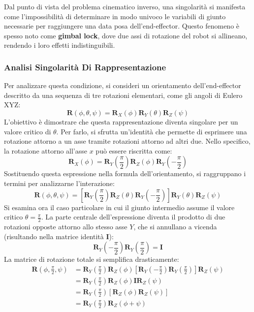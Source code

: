 ﻿\documentclass[11pt, a4paper]{article}
\begin{document}
Dal punto di vista del problema cinematico inverso, una singolarità si manifesta come l'impossibilità di determinare in modo univoco le variabili di giunto necessarie per raggiungere una data posa dell'end-effector. Questo fenomeno è spesso noto come \textbf{gimbal lock}, dove due assi di rotazione del robot si allineano, rendendo i loro effetti indistinguibili.

\subsubsection*{Analisi Singolarità Di Rappresentazione}
Per analizzare questa condizione, si consideri un orientamento dell'end-effector descritto da una sequenza di tre rotazioni elementari, come gli angoli di Eulero XYZ:
\[
    \mathbf{R}(\phi, \theta, \psi) = \mathbf{R}_{X}(\phi) \mathbf{R}_{Y}(\theta) \mathbf{R}_{Z}(\psi)
\]
L'obiettivo è dimostrare che questa rappresentazione diventa singolare per un valore critico di \(\theta\). Per farlo, si sfrutta un'identità che permette di esprimere una rotazione attorno a un asse tramite rotazioni attorno ad altri due. Nello specifico, la rotazione attorno all'asse \(x\) può essere riscritta come:
\[
    \mathbf{R}_{X}(\phi) = \mathbf{R}_{Y}\left(\frac{\pi}{2}\right) \mathbf{R}_{Z}(\phi) \mathbf{R}_{Y}\left(-\frac{\pi}{2}\right)
\]
Sostituendo questa espressione nella formula dell'orientamento, si raggruppano i termini per analizzarne l'interazione:
\[
    \mathbf{R}(\phi, \theta, \psi) = \left[ \mathbf{R}_{Y}\left(\frac{\pi}{2}\right) \mathbf{R}_{Z}(\theta) \mathbf{R}_{Y}\left(-\frac{\pi}{2}\right) \right] \mathbf{R}_{Y}(\theta) \mathbf{R}_{Z}(\psi)
\]
Si esamina ora il caso particolare in cui il giunto intermedio assume il valore critico \( \theta = \frac{\pi}{2} \). La parte centrale dell'espressione diventa il prodotto di due rotazioni opposte attorno allo stesso asse \(Y\), che si annullano a vicenda (risultando nella matrice identità \(\mathbf{I}\)):
\[
    \mathbf{R}_{Y}\left(-\frac{\pi}{2}\right) \mathbf{R}_{Y}\left(\frac{\pi}{2}\right) = \mathbf{I}
\]
La matrice di rotazione totale si semplifica drasticamente:
\begin{align*}
    \mathbf{R}\left(\phi, \frac{\pi}{2}, \psi\right) &= \mathbf{R}_{Y}\left(\frac{\pi}{2}\right) \mathbf{R}_{Z}(\phi) \left[ \mathbf{R}_{Y}\left(-\frac{\pi}{2}\right) \mathbf{R}_{Y}\left(\frac{\pi}{2}\right) \right] \mathbf{R}_{Z}(\psi) \\
    &= \mathbf{R}_{Y}\left(\frac{\pi}{2}\right) \mathbf{R}_{Z}(\phi) \mathbf{I} \mathbf{R}_{Z}(\psi) \\
    &= \mathbf{R}_{Y}\left(\frac{\pi}{2}\right) \left[ \mathbf{R}_{Z}(\phi) \mathbf{R}_{Z}(\psi) \right] \\
    &= \mathbf{R}_{Y}\left(\frac{\pi}{2}\right) \mathbf{R}_{Z}(\phi + \psi)
\end{align*}
\end{document}
